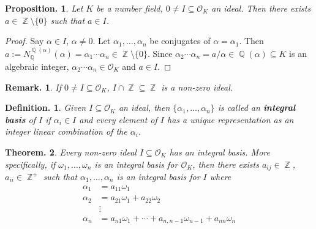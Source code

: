 \documentclass[11pt, a4paper]{memoir}
\DeclareMathOperator{\Q}{{\mathbb{Q}}}
\DeclareMathOperator{\Z}{{\mathbb{Z}}}
\theoremstyle{change}
\newtheorem{theorem}{Theorem.}[section]
\newtheorem{proposition}[theorem]{Proposition.}
\theoremstyle{plain}
\theoremstyle{nonumberplain}
\newtheorem{definition}{Definition.}
\newtheorem{remark}{Remark.}
\newtheorem{proof}{Proof}
\begin{document}
\begin{proposition}
    Let $K$ be a number field, $0\neq I\subseteq\mathcal{O}_K$ an ideal.
    Then there exists $a\in\Z\setminus\{0\}$ such that $a\in I$.
\end{proposition}
\begin{proof}
    Say $\alpha\in I$, $\alpha\neq 0$.
    Let $\alpha_1,\ldots,\alpha_n$ be conjugates of $\alpha=\alpha_1$.
    Then $a:=N_{\Q}^{\Q(\alpha)}(\alpha)=\alpha_1\cdots\alpha_n\in\Z\setminus\{0\}$.
    Since $\alpha_2\cdots\alpha_n=a/\alpha\in\Q(\alpha)\subseteq K$ is an algebraic integer, $\alpha_2\cdots\alpha_n\in\mathcal{O}_K$ and $a\in I$.
\end{proof}
\begin{remark}
    If $0\neq I\subseteq\mathcal{O}_K$, $I\cap\Z\subseteq\Z$ is a non-zero ideal.
\end{remark}
\begin{definition}
    Given $I\subseteq\mathcal{O}_K$ an ideal, then $\{\alpha_1,\ldots,\alpha_n\}$ is called an \textbf{integral basis} of $I$ if $\alpha_i\in I$ and every element of $I$ has a unique representation as an integer linear combination of the $\alpha_i$.
\end{definition}
\begin{theorem}
    Every non-zero ideal $I\subseteq\mathcal{O}_K$ has an integral basis.
    More specifically, if $\omega_1,\ldots,\omega_n$ is an integral basis for $\mathcal{O}_K$, then there exists $a_{ij}\in\Z$, $a_{ii}\in\Z^+$ such that $\alpha_1,\ldots,\alpha_n$ is an integral basis for $I$ where
    \begin{align*}
        \alpha_1 &= a_{11}\omega_1\\
        \alpha_2 &= a_{21}\omega_1+a_{22}\omega_2\\
                 &\vdots\\
        \alpha_n &= a_{n1}\omega_1+\cdots+a_{n,n-1}\omega_{n-1}+a_{nn}\omega_n
    \end{align*}
\end{theorem}
\end{document}
